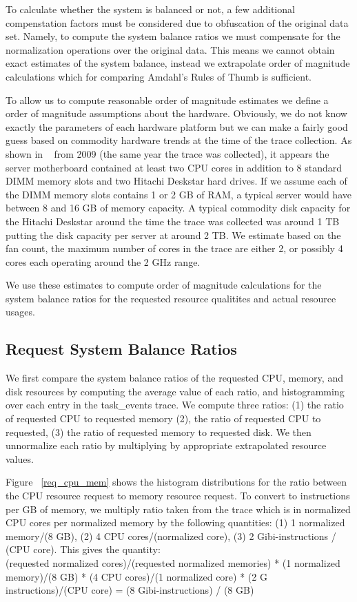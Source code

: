 \documentclass{sig-alternate}
\begin{document}
To calculate whether the system is balanced or not, a few additional compenstation factors must be considered due to obfuscation of the original data set.
Namely, to compute the system balance ratios we must compensate for the normalization operations over the original data.
This means we cannot obtain exact estimates of the system balance, instead we extrapolate order of magnitude calculations which for comparing Amdahl's Rules of Thumb is sufficient.

To allow us to compute reasonable order of magnitude estimates we define a order of magnitude assumptions about the hardware.
Obviously, we do not know exactly the parameters of each hardware platform but we can make a fairly good guess based on commodity hardware trends at the time of the trace collection.
As shown in ~\cite{googlehw} from 2009 (the same year the trace was collected), it appears the server motherboard contained at least two CPU cores in addition to 8 standard DIMM memory slots and two Hitachi Deskstar hard drives.
If we assume each of the DIMM memory slots contains 1 or 2 GB of RAM, a typical server would have between 8 and 16 GB of memory capacity.
A typical commodity disk capacity for the Hitachi Deskstar around the time the trace was collected was around 1 TB putting the disk capacity per server at around 2 TB.
We estimate based on the fan count, the maximum number of cores in the trace are either 2, or possibly 4 cores each operating around the 2 GHz range.

We use these estimates to compute order of magnitude calculations for the system balance ratios for the requested resource qualitites and actual resource usages.

\subsection{Request System Balance Ratios}

We first compare the system balance ratios of the requested CPU, memory, and disk resources by computing the average value of each ratio, and histogramming over each entry in the task\_events trace.
We compute three ratios: (1) the ratio of requested CPU to requested memory (2), the ratio of requested CPU to requested, (3) the ratio of requested memory to requested disk.
We then unnormalize each ratio by multiplying by appropriate extrapolated resource values.

Figure ~\ref{req_cpu_mem} shows the histogram distributions for the ratio between the CPU resource request to memory resource request. 
To convert to instructions per GB of memory, we multiply ratio taken from the trace which is in normalized CPU cores per normalized memory by the following quantities: (1) 1 normalized memory/(8 GB), (2) 4 CPU cores/(normalized core), (3) 2 Gibi-instructions / (CPU core).  %
This gives the quantity: \\
(requested normalized cores)/(requested normalized memories) * (1 normalized memory)/(8 GB) * (4 CPU cores)/(1 normalized core) * (2 G instructions)/(CPU core) = (8 Gibi-instructions) / (8 GB)
\end{document}
